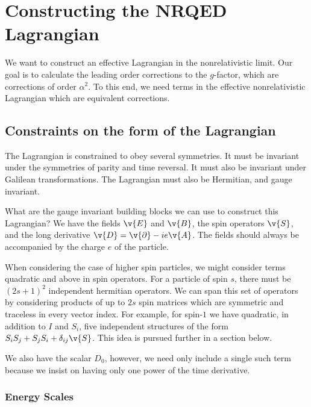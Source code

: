 



\section{Constructing the NRQED Lagrangian}



We want to construct an effective Lagrangian in the nonrelativistic limit.  Our goal is to calculate the leading order corrections to the $g$-factor, which are corrections of order $\alpha^2$.  To this end, we need terms in the effective nonrelativistic Lagrangian which are equivalent corrections.


\subsection{Constraints on the form of the Lagrangian}
The Lagrangian is constrained to obey several symmetries.  It must be invariant under the symmetries of parity and time reversal.  It must also be invariant under Galilean transformations.  The Lagrangian must also be Hermitian, and gauge invariant.

What are the gauge invariant building blocks we can use to construct this Lagrangian?  We have the fields $\v{E}$ and $\v{B}$, the spin operators $\v{S}$, and the long derivative $\v{D} = \v{\partial} - i e\v{A}$.  The fields should always be accompanied by the charge $e$ of the particle.

When considering the case of higher spin particles, we might consider terms quadratic and above in spin operators.  For a particle of spin $s$, there must be $(2s+1)^2$ independent hermitian operators.  We can span this set of operators by considering products of up to $2s$ spin matrices which are symmetric and traceless in every vector index.  For example, for spin-$1$ we have quadratic, in addition to $I$ and $S_i$, five independent structures of the form $ S_i S_j + S_j S_i + \delta_{ij} \v{S}$.  This idea is pursued further in a section below.


We also have the scalar $D_0$, however, we need only include a single such term because we insist on having only one power of the time derivative.



\subsubsection{Energy Scales}

